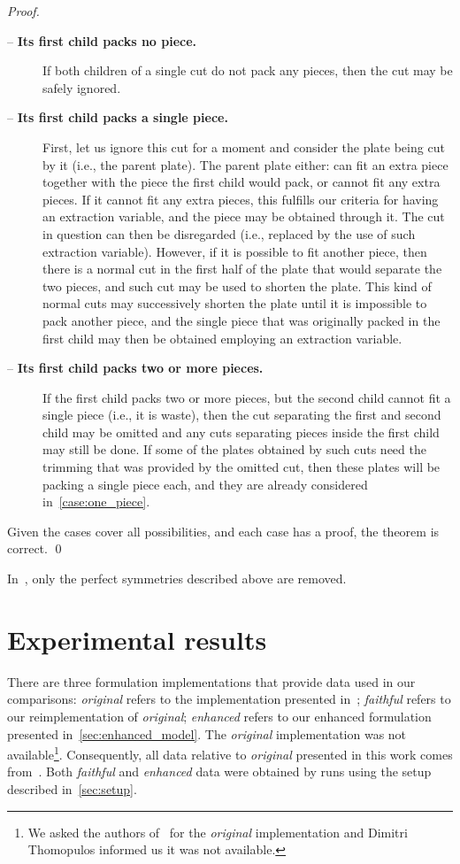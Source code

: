 \documentclass[smallextended]{svjour3}       %
\begin{document}
\begin{proof}
\begin{description}
\item[ -- \textbf{Its first child packs no piece.}]
If both children of a single cut do not pack any pieces, then the cut may be safely ignored.
\item[ -- \textbf{Its first child packs a single piece.}]
First, let us ignore this cut for a moment and consider the plate being cut by it (i.e., the parent plate).
The parent plate either: can fit an extra piece together with the piece the first child would pack, or cannot fit any extra pieces.
If it cannot fit any extra pieces, this fulfills our criteria for having an extraction variable, and the piece may be obtained through it.
The cut in question can then be disregarded (i.e., replaced by the use of such extraction variable).
However, if it is possible to fit another piece, then there is a normal cut in the first half of the plate that would separate the two pieces, and such cut may be used to shorten the plate.
This kind of normal cuts may successively shorten the plate until it is impossible to pack another piece, and the single piece that was originally packed in the first child may then be obtained employing an extraction variable.
\item[ -- \textbf{Its first child packs two or more pieces.}]
If the first child packs two or more pieces, but the second child cannot fit a single piece (i.e., it is waste), then the cut separating the first and second child may be omitted and any cuts separating pieces inside the first child may still be done.
If some of the plates obtained by such cuts need the trimming that was provided by the omitted cut, then these plates will be packing a single piece each, and they are already considered in~\cref{case:one_piece}.
\end{description}

Given the cases cover all possibilities, and each case has a proof, the theorem is correct. \qed

\end{proof}

In~\cite{furini:2016}, only the perfect symmetries described above are removed.

\section{Experimental results}
\label{sec:experimental_results}

There are three formulation implementations that provide data used in our comparisons:
\emph{original} refers to the implementation presented in~\cite{furini:2016,dimitri_thesis};
\emph{faithful} refers to our reimplementation of \emph{original};
\emph{enhanced} refers to our enhanced formulation presented in~\autoref{sec:enhanced_model}.
The \emph{original} implementation was not available\footnote{
	We asked the authors of~\cite{furini:2016} for the \emph{original} implementation and Dimitri Thomopulos informed us it was not available.
}.
Consequently, all data relative to \emph{original} presented in this work comes from~\cite{dimitri_thesis}.
Both \emph{faithful} and \emph{enhanced} data were obtained by runs using the setup described in~\autoref{sec:setup}.
\end{document}
